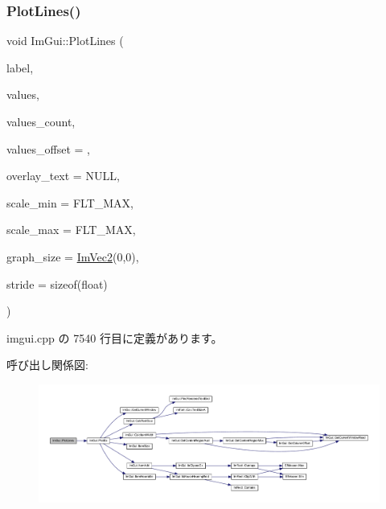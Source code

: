 \subsubsection{\texorpdfstring{Plot\+Lines()}{PlotLines()}\hspace{0.1cm}{\footnotesize\ttfamily [1/2]}}
{\footnotesize\ttfamily void Im\+Gui\+::\+Plot\+Lines (\begin{DoxyParamCaption}\item[{const char $\ast$}]{label,  }\item[{const float $\ast$}]{values,  }\item[{int}]{values\+\_\+count,  }\item[{int}]{values\+\_\+offset = {},  }\item[{const char $\ast$}]{overlay\+\_\+text = {\ttfamily NULL},  }\item[{float}]{scale\+\_\+min = {\ttfamily FLT\+\_\+MAX},  }\item[{float}]{scale\+\_\+max = {\ttfamily FLT\+\_\+MAX},  }\item[{\mbox{\hyperlink{struct_im_vec2}{Im\+Vec2}}}]{graph\+\_\+size = {\ttfamily \mbox{\hyperlink{struct_im_vec2}{Im\+Vec2}}(0,0)},  }\item[{int}]{stride = {\ttfamily sizeof(float)} }\end{DoxyParamCaption})}



 imgui.\+cpp の 7540 行目に定義があります。

呼び出し関係図\+:\nopagebreak
\begin{figure}[H]
\begin{center}
\leavevmode
\includegraphics[width=350pt]{namespace_im_gui_a2bc21c56e4796855313804086cca114f_cgraph}
\end{center}
\end{figure}
\mbox{\label{namespace_im_gui_a94a2645d45c96da35b834dc7db93a9f1}} 
